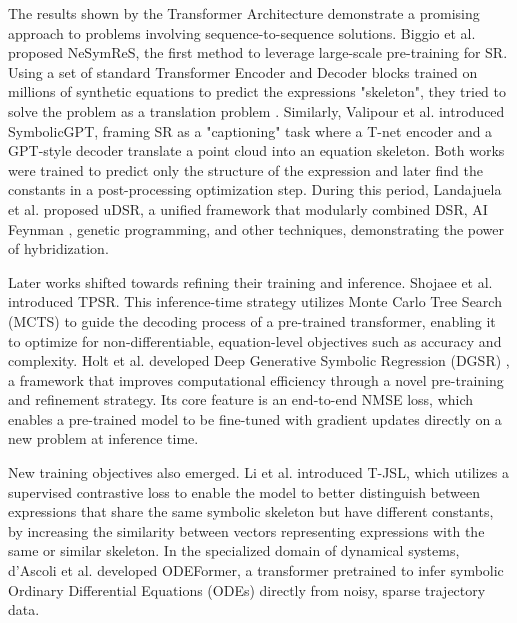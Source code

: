 The results shown by the Transformer Architecture \cite{vaswani2017_attention_is_all} demonstrate a promising approach to problems involving sequence-to-sequence solutions. Biggio et al. \cite{biggio_neural_2021} proposed NeSymReS, the first method to leverage large-scale pre-training for SR. Using a set of standard Transformer Encoder and Decoder blocks trained on millions of synthetic equations to predict the expressions "skeleton", they tried to solve the problem as a translation problem \cite{biggio_neural_2021}. Similarly, Valipour et al. introduced SymbolicGPT, framing SR as a "captioning" task where a T-net encoder and a GPT-style decoder translate a point cloud into an equation skeleton. Both works were trained to predict only the structure of the expression and later find the constants in a post-processing optimization step. During this period, Landajuela et al.  \cite{landajuela_unified_2022} proposed uDSR, a unified framework that modularly combined DSR, AI Feynman \cite{ai_feyman2}, genetic programming, and other techniques, demonstrating the power of hybridization.

Later works shifted towards refining their training and inference. Shojaee et al. \cite{shojaee_transformer-based_2023} introduced TPSR. This inference-time strategy utilizes Monte Carlo Tree Search (MCTS) to guide the decoding process of a pre-trained transformer, enabling it to optimize for non-differentiable, equation-level objectives such as accuracy and complexity. Holt et al. developed Deep Generative Symbolic Regression (DGSR) \cite{holt_deep_2023}, a framework that improves computational efficiency through a novel pre-training and refinement strategy. Its core feature is an end-to-end NMSE loss, which enables a pre-trained model to be fine-tuned with gradient updates directly on a new problem at inference time.

New training objectives also emerged. Li et al. \cite{li_transformer-based_2023} introduced T-JSL, which utilizes a supervised contrastive loss to enable the model to better distinguish between expressions that share the same symbolic skeleton but have different constants, by increasing the similarity between vectors representing expressions with the same or similar skeleton. In the specialized domain of dynamical systems, d'Ascoli et al. \cite{dascoli_odeformer_2023} developed ODEFormer, a transformer pretrained to infer symbolic Ordinary Differential Equations (ODEs) directly from noisy, sparse trajectory data.


